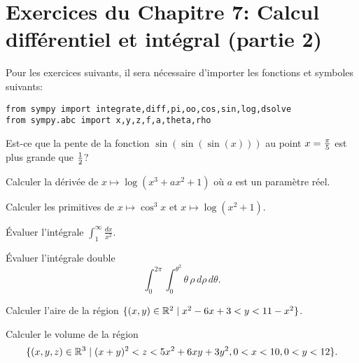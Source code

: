 
\section*{Exercices du Chapitre 7: Calcul différentiel et intégral (partie 2)}

Pour les exercices suivants, il sera nécessaire d'importer les fonctions
et symboles suivants:
\begin{verbatim}
from sympy import integrate,diff,pi,oo,cos,sin,log,dsolve
from sympy.abc import x,y,z,f,a,theta,rho
\end{verbatim}

\begin{exercice}
    Est-ce que la pente de la fonction $\sin(\sin(\sin(x)))$ au point
    $x={\pi\over5}$ est plus grande que $1\over2$?
\end{exercice}

\begin{exercice}
    Calculer la dérivée de $x\mapsto\log(x^3+ax^2+1)$ où $a$ est un paramètre
    réel.
\end{exercice}

\begin{exercice}
    Calculer les primitives de $x\mapsto\cos^3 x$ et 
    $x\mapsto\log(x^2+1)$.
\end{exercice}

\begin{exercice}
    Évaluer l'intégrale $\int_1^{\infty} \frac{dx}{x^2}$.
\end{exercice}

\begin{exercice}
    Évaluer l'intégrale double 
    $$\int_0^{2\pi}\int_0^{\theta^2}\theta\,\rho\,d\rho\,d\theta.$$
\end{exercice}

\begin{exercice}
    Calculer l'aire de la région 
    $\{(x,y)\in\mathbb{R}^2\mid x^2-6x+3 < y < 11-x^2\}$.
\end{exercice}

\begin{exercice}
    Calculer le volume de la région 
    $$\{(x,y,z)\in\mathbb{R}^3\mid (x+y)^2 < z < 5x^2+6xy+3y^2, 0<x<10, 0<y<12\}.$$
\end{exercice}

